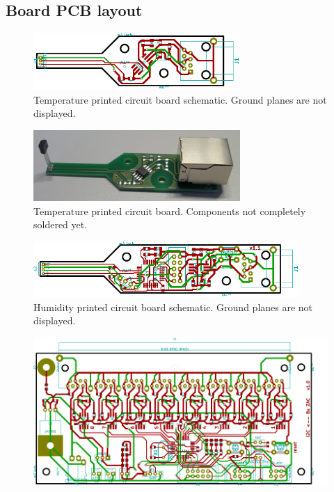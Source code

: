 \documentclass[a4paper]{scrreprt}
\begin{document}
\begin{appendices}
\chapter{Board PCB layout}
\begin{figure}[Hh!]
	\centering
	\includegraphics[width=0.7\textwidth]{img/boards/temperature_kicad.pdf}
	\caption{Temperature printed circuit board schematic. Ground planes are not displayed.}
	\label{fig:pcb_temp}
\end{figure}
\begin{figure}[Hh!]
	\centering
	\includegraphics[width=0.7\textwidth]{img/boards/temperature_pcp.jpg}
	\caption{Temperature printed circuit board. Components not completely soldered yet.}
	\label{fig:soldered_temp}
\end{figure}
\begin{figure}[Hh!]
	\centering
	\includegraphics[width=0.9\textwidth]{img/boards/humidity_kicad.pdf}
	\caption{Humidity printed circuit board schematic. Ground planes are not displayed.}
	\label{fig:pcb_hum}
\end{figure}
\begin{figure}[Hh!]
	\centering
	\includegraphics[height=0.7\textwidth, angle=270]{img/boards/collector_kicad.pdf}

\end{figure}
\end{appendices}
\end{document}
